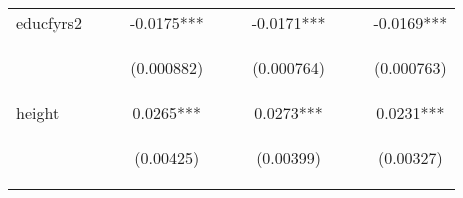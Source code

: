 \documentclass[]{article}
\begin{document}
\begin{center}
\begin{tabular}{lccccccccc}
educfyrs2 &  &  & -0.0175*** &  &  & -0.0171*** &  &  & -0.0169*** \\
\vspace{4pt} & \begin{footnotesize}\end{footnotesize} & \begin{footnotesize}\end{footnotesize} & \begin{footnotesize}(0.000882)\end{footnotesize} & \begin{footnotesize}\end{footnotesize} & \begin{footnotesize}\end{footnotesize} & \begin{footnotesize}(0.000764)\end{footnotesize} & \begin{footnotesize}\end{footnotesize} & \begin{footnotesize}\end{footnotesize} & \begin{footnotesize}(0.000763)\end{footnotesize} \\
height &  &  & 0.0265*** &  &  & 0.0273*** &  &  & 0.0231*** \\
\vspace{4pt} & \begin{footnotesize}\end{footnotesize} & \begin{footnotesize}\end{footnotesize} & \begin{footnotesize}(0.00425)\end{footnotesize} & \begin{footnotesize}\end{footnotesize} & \begin{footnotesize}\end{footnotesize} & \begin{footnotesize}(0.00399)\end{footnotesize} & \begin{footnotesize}\end{footnotesize} & \begin{footnotesize}\end{footnotesize} & \begin{footnotesize}(0.00327)\end{footnotesize} \\

\end{tabular}
\end{center}
\end{document}
